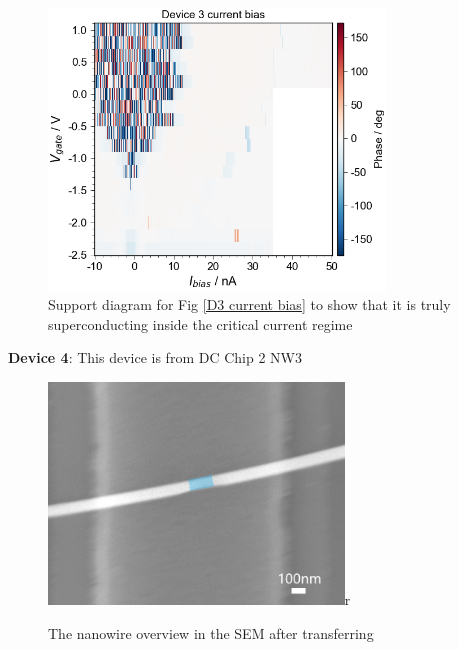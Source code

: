 \begin{figure}[h!]
    \centering
    \includegraphics[width=0.8\textwidth]{Pic/D3Ibiasphase.png}
    \caption{Support diagram for Fig \ref{D3 current bias} to show that it is truly superconducting inside the critical current regime}
    \label{fig:my_label}
\end{figure}

\clearpage
\noindent \textbf{Device 4}: This device is from DC Chip 2 NW3

\begin{figure}[h!]
    \centering
    \includegraphics[width=0.7\textwidth]{Pic/D4.png}r
    \caption{The nanowire overview in the SEM after transferring}
    \label{fig:my_label}
\end{figure}

